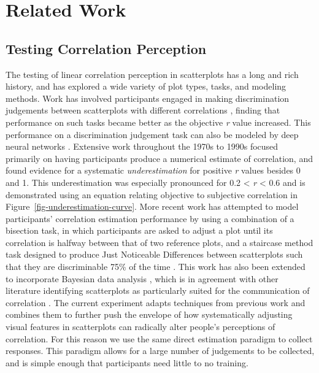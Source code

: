 \documentclass[manuscript, review, anonymous, screen]{acmart}
\begin{document}
\hypertarget{sec-related-work}{%
\section{Related Work}\label{sec-related-work}}

\hypertarget{sec-testing-corr-percept}{%
\subsection{Testing Correlation
Perception}\label{sec-testing-corr-percept}}

The testing of linear correlation perception in scatterplots has a long
and rich history, and has explored a wide variety of plot types, tasks,
and modeling methods. Work has involved participants engaged in making
discrimination judgements between scatterplots with different
correlations \citep{pollack_1960, doherty_2007}, finding that
performance on such tasks became better as the objective \emph{r} value
increased. This performance on a discrimination judgement task can also
be modeled by deep neural networks \citep{yang_2023}. Extensive work
throughout the 1970s to 1990s focused primarily on having participants
produce a numerical estimate of correlation, and found evidence for a
systematic \emph{underestimation} for positive \emph{r} values besides 0
and 1. This underestimation was especially pronounced for 0.2
\textless{} \emph{r} \textless{} 0.6
\citep{strahan_1978, bobko_1979, cleveland_1982, lane_1985, lauer_1989, collyer_1990, meyer_1992}
and is demonstrated using an equation relating objective to subjective
correlation \citep{rensink_2017} in
Figure~\ref{fig-underestimation-curve}. More recent work has attempted
to model participants' correlation estimation performance by using a
combination of a bisection task, in which participants are asked to
adjust a plot until its correlation is halfway between that of two
reference plots, and a staircase method task designed to produce Just
Noticeable Differences between scatterplots such that they are
discriminable 75\% of the time \citep{rensink_2010}. This work has also
been extended to incorporate Bayesian data analysis \citep{kay_2015},
which is in agreement with other literature identifying scatterplots as
particularly suited for the communication of correlation
\citep{li_2010}. The current experiment adapts techniques from previous
work \citep{strain_2023, strain_2023b} and combines them to further push
the envelope of how systematically adjusting visual features in
scatterplots can radically alter people's perceptions of correlation.
For this reason we use the same direct estimation paradigm to collect
responses. This paradigm allows for a large number of judgements to be
collected, and is simple enough that participants need little to no
training.
\end{document}
